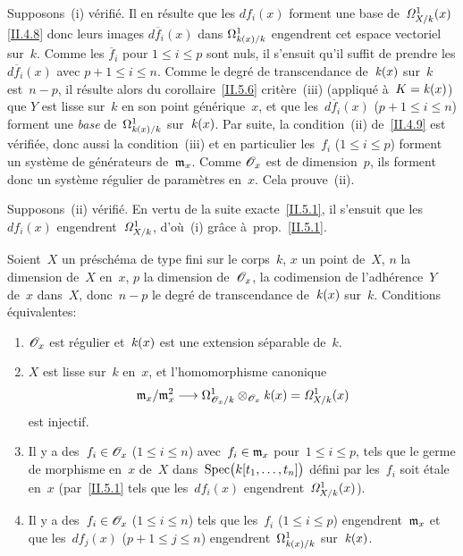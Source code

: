 Supposons~(i) v\'erifi\'e. Il en r\'esulte que les $df_i(x)$
forment une base de~$\it{\Omega}^1_{X/k}(x)$ \eqref{II.4.8} donc leurs
images $d\overline{f}_i(x)$ dans $\Omega^1_{\kres(x)/k}$ engendrent
cet espace vectoriel sur~$k$. Comme les $\overline{f}_i$ pour $1\leq
i\leq p$ sont nuls, il s'ensuit qu'il suffit de prendre les
$d\overline{f}_i(x)$ avec $p+1\leq i\leq n$. Comme le degr\'e de
transcendance de~$\kres(x)$ sur~$k$ est~$n-p$, il r\'esulte alors
du corollaire~\ref{II.5.6} crit\`ere~(iii) (appliqu\'e
\`a~$K=\kres(x)$) que $Y$ est lisse sur~$k$ en son point
g\'en\'erique~$x$, et que les~$d\overline{f}_i(x)$ ($p+1\leq i\leq
n$) forment une \emph{base} de~$\Omega^1_{\kres(x)/k}$
sur~$\kres(x)$. Par suite, la condition~(ii) de~\ref{II.4.9} est
v\'erifi\'ee, donc aussi la condition~(iii) et en particulier
les~$f_i$ ($1\leq i\leq p$) forment un syst\`eme de
g\'en\'erateurs de~$\goth{m}_x$. Comme
$\cal{O}_x$ est de dimension~$p$, ils forment donc un syst\`eme
r\'egulier de param\`etres en~$x$. Cela prouve~(ii).

Supposons~(ii) v\'erifi\'e. En vertu de la suite
exacte~\eqref{II.5.1}, il s'ensuit que les~$df_i(x)$
engendrent~$\it{\Omega}^1_{X/k}$,
d'o\`u~(i) gr\^ace \`a~prop.\, \ref{II.5.1}.

\begin{corollaire}
\label{II.5.9} Soient~$X$ un pr\'esch\'ema de type fini sur le
corps~$k$, $x$ un point de~$X$, $n$ la dimension de~$X$ en~$x$, $p$ la
dimension
de~$\cal{O}_x$,
\ie la codimension de l'adh\'erence~$Y$
de~$x$ dans~$X$, donc~$n-p$ le degr\'e de transcendance
de~$\kres(x)$
sur~$k$. Conditions \'equivalentes:
\begin{enumerate}
\item[(i)] $\cal{O}_x$ est r\'egulier
et~$\kres(x)$
 est une
extension s\'eparable de~$k$.
\item[(ii)] $X$ est lisse sur~$k$ en~$x$, et l'homomorphisme canonique
$$
\goth{m}_x/\goth{m}_x^2\to
\Omega^1_{\cal{O}_x/k}\otimes_{\cal{O}_x}
\kres(x)=\it{\Omega}^1_{X/k}(x)
$$
est injectif.
\item[(iii)] Il y a des~$f_i\in \cal{O}_x$ ($1\leq i\leq n$)
avec~$f_i\in \goth{m}_x$ pour~$1\leq i\leq p$, tels que le germe de
morphisme en~$x$ de~$X$ dans~$\Spec\bigl(k[t_1,\dots,t_n]\bigr)$
d\'efini par les~$f_i$ soit \'etale en~$x$ (\ie par~\ref{II.5.1}
tels que les~$df_i(x)$ engendrent~$\it{\Omega}^1_{X/k}(x)$).
\item[(iv)] Il y a des~$f_i\in \cal{O}_x$ ($1\leq i\leq n$) tels que
les~$f_i$ ($1\leq i\leq p$) engendrent~$\goth{m}_x$ et que
les~$df_j(x)$ ($p+1\leq j\leq n$) 
engendrent~$\Omega^1_{\kres(x)/k}$ sur~$\kres(x)$.
\end{enumerate}
\end{corollaire}

